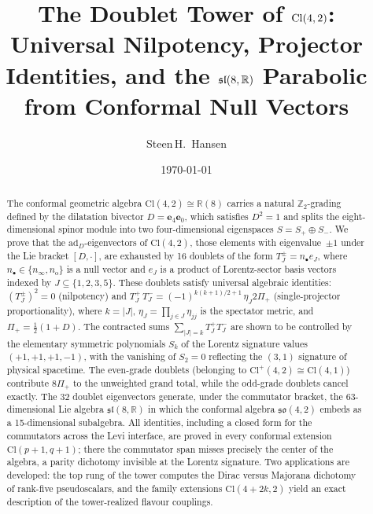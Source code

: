 \documentclass{birkjour}
\title[The Doublet Tower of $\Cl(4,2)$]
{The Doublet Tower of $\Cl(4,2)$:
Universal Nilpotency, Projector Identities,
and the $\slR(8,\R)$ Parabolic from Conformal Null Vectors}
\author[S.\,H.\ Hansen]{Steen\,H.\ Hansen}
\date{\today}
\theoremstyle{definition}
\theoremstyle{remark}
\numberwithin{equation}{section}
\newcommand{\Cl}{\mathrm{Cl}}
\newcommand{\so}{\mathfrak{so}}
\newcommand{\slR}{\mathfrak{sl}}
\newcommand{\e}[1]{\bm{e}_{#1}}
\newcommand{\no}{n_{\mathrm{o}}}
\newcommand{\ninf}{n_{\infty}}
\newcommand{\R}{\mathbb{R}}
\newcommand{\Z}{\mathbb{Z}}
\newcommand{\ad}{\mathrm{ad}}
\providecommand{\rev}{{}}
\begin{document}
\begin{abstract}
The conformal geometric algebra $\Cl(4,2)\cong\R(8)$ carries
a natural $\Z_2$-grading defined by the dilatation bivector
$D=\e{4}\e{0}$, which satisfies $D^2=1$ and splits the
eight-dimensional spinor module into two four-dimensional
eigenspaces $S=S_+\oplus S_-$.
We prove that the $\ad_D$-eigenvectors of 
$\Cl(4,2)$, those
elements with eigenvalue~$\pm1$ under the Lie bracket
$[D,\cdot]$, are exhausted by 16 doublets of the form
$T^\pm_J=n_\bullet e_J$, where
$n_\bullet\in\{\ninf,\no\}$ is a null vector and
$e_J$ is a product of Lorentz-sector basis vectors indexed
by $J\subseteq\{1,2,3,5\}$.
These doublets satisfy universal algebraic identities:
$(T^\pm_J)^2=0$ (nilpotency) and
$T^+_J\,T^-_J=(-1)^{k(k+1)/2+1}\,\eta_J 2\Pi_+$
(single-projector proportionality), where $k=|J|$,
$\eta_J=\prod_{j\in J}\eta_{jj}$ is the spectator metric,
and $\Pi_+=\tfrac12(1+D)$.
The contracted sums $\sum_{|J|=k}T^+_J T^-_J$ are shown to
be controlled by the elementary symmetric polynomials $S_k$
of the Lorentz signature values $(+1,+1,+1,-1)$, with the
vanishing of $S_2=0$ reflecting the $(3,1)$ signature of
physical spacetime.
The even-grade doublets (belonging to
$\Cl^+(4,2)\cong\Cl(4,1)$) contribute $8\Pi_+$ to the
unweighted grand total, while the odd-grade doublets
cancel exactly.
The 32 doublet eigenvectors generate, under the commutator
bracket, the 63-dimensional Lie algebra
$\slR(8,\R)$
in which the
conformal algebra $\so(4,2)$ embeds as a 15-dimensional
subalgebra.
\rev{All identities, including a closed form for the
commutators across the Levi interface, are proved in every
conformal extension $\Cl(p+1,q+1)$; there the commutator
span misses precisely the center of the algebra, a parity
dichotomy invisible at the Lorentz signature. Two
applications are developed: the top rung of the tower
computes the Dirac versus Majorana dichotomy of rank-five
pseudoscalars, and the family extensions $\Cl(4+2k,2)$
yield an exact description of the tower-realized flavour
couplings.}
\end{abstract}

\maketitle

\end{document}

